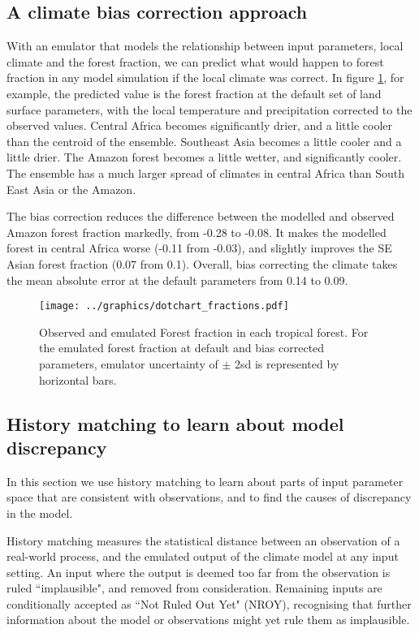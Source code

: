 \documentclass[gmd, manuscript]{copernicus}
\begin{document}
\subsection{A climate bias correction approach}
With an emulator that models the relationship between input parameters, local climate and the forest fraction, we can predict what would happen to forest fraction in any model simulation if the local climate was correct. In figure \ref{fig:dotchart_fractions}, for example, the predicted value is the forest fraction at the default set of land surface parameters, with the local temperature and precipitation corrected to the observed values. Central Africa becomes significantly drier, and a little cooler than the centroid of the ensemble. Southeast Asia becomes a little cooler and a little drier. The Amazon forest becomes a little wetter, and significantly cooler. The ensemble has a much larger spread of climates in central Africa than South East Asia or the Amazon.

The bias correction reduces the difference between the modelled and observed Amazon forest fraction markedly, from -0.28 to -0.08. It makes the modelled forest in central Africa worse (-0.11 from -0.03), and slightly improves the SE Asian forest fraction (0.07 from 0.1). Overall, bias correcting the climate takes the mean absolute error at the default parameters from 0.14 to 0.09.


\begin{figure}[t]
\texttt{[image: ../graphics/dotchart\_fractions.pdf]}
\caption{Observed and emulated Forest fraction in each tropical forest. For the emulated forest fraction at default and bias corrected parameters, emulator uncertainty of $\pm$ 2sd is represented by horizontal bars.
}
\label{fig:dotchart_fractions}
\end{figure}


\subsection{History matching to learn about model discrepancy}
In this section we use history matching to learn about parts of input parameter space that are consistent with observations, and to find the causes of discrepancy in the model.

History matching measures the statistical distance between an observation of a real-world process, and the emulated output of the climate model at any input setting. An input where the output is deemed too far from the observation is ruled ``implausible", and removed from consideration. Remaining inputs are conditionally accepted as ``Not Ruled Out Yet" (NROY), recognising that further information about the model or observations might yet rule them as implausible.
\end{document}
